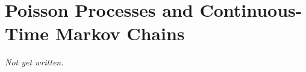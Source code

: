 \chapter{Poisson Processes and Continuous-Time Markov Chains}\label{ch:poisson-ctmc}


\textit{Not yet written.}
